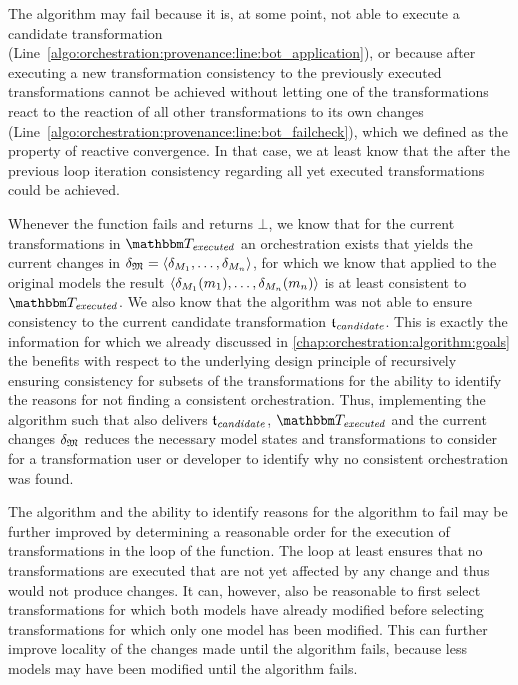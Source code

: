 The algorithm may fail because it is, at some point, not able to execute a candidate transformation (Line~\ref{algo:orchestration:provenance:line:bot_application}), or because after executing a new transformation consistency to the previously executed transformations cannot be achieved without letting one of the transformations react to the reaction of all other transformations to its own changes (Line~\ref{algo:orchestration:provenance:line:bot_failcheck}), which we defined as the property of reactive convergence.
In that case, we at least know that the after the previous loop iteration consistency regarding all yet executed transformations could be achieved.

Whenever the  function fails and returns $\bot$, we know that for the current transformations in $\provalgexecuted$ an orchestration exists that yields the current changes in $\mathfrak{\delta}_{\mathfrak{M}} = \langle \delta_{M_{1}}, \dots, \delta_{M_{n}} \rangle$, for which we know that applied to the original models the result $\langle \delta_{M_{1}}(m_{1}), \dots, \delta_{M_{n}}(m_{n}) \rangle$ is at least consistent to $\provalgexecuted$.
We also know that the algorithm was not able to ensure consistency to the current candidate transformation $\mathfrak{t}_{\mathit{candidate}}$.
This is exactly the information for which we already discussed in \autoref{chap:orchestration:algorithm:goals} the benefits with respect to the underlying design principle of recursively ensuring consistency for subsets of the transformations for the ability to identify the reasons for not finding a consistent orchestration.
Thus, implementing the algorithm such that also delivers $\mathfrak{t}_{\mathit{candidate}}$, $\provalgexecuted$ and the current changes $\mathfrak{\delta}_{\mathfrak{M}}$ reduces the necessary model states and transformations to consider for a transformation user or developer to identify why no consistent orchestration was found.


The algorithm and the ability to identify reasons for the algorithm to fail may be further improved by determining a reasonable order for the execution of transformations in the loop of the  function.
The loop at least ensures that no transformations are executed that are not yet affected by any change and thus would not produce changes.
It can, however, also be reasonable to first select transformations for which both models have already modified before selecting transformations for which only one model has been modified.
This can further improve locality of the changes made until the algorithm fails, because less models may have been modified until the algorithm fails.



